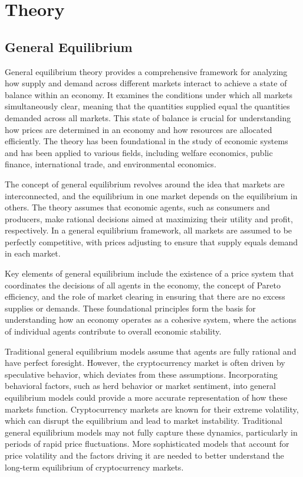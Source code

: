 
\chapter{Theory}
\label{cT} 


\section{General Equilibrium}\label{cTGE}
General equilibrium theory provides a comprehensive framework for analyzing how supply and demand across different markets interact to achieve a state of balance within an economy. It examines the conditions under which all markets simultaneously clear, meaning that the quantities supplied equal the quantities demanded across all markets. This state of balance is crucial for understanding how prices are determined in an economy and how resources are allocated efficiently. The theory has been foundational in the study of economic systems and has been applied to various fields, including welfare economics, public finance, international trade, and environmental economics.

The concept of general equilibrium revolves around the idea that markets are interconnected, and the equilibrium in one market depends on the equilibrium in others. The theory assumes that economic agents, such as consumers and producers, make rational decisions aimed at maximizing their utility and profit, respectively. In a general equilibrium framework, all markets are assumed to be perfectly competitive, with prices adjusting to ensure that supply equals demand in each market.

Key elements of general equilibrium include the existence of a price system that coordinates the decisions of all agents in the economy, the concept of Pareto efficiency, and the role of market clearing in ensuring that there are no excess supplies or demands. These foundational principles form the basis for understanding how an economy operates as a cohesive system, where the actions of individual agents contribute to overall economic stability.

Traditional general equilibrium models assume that agents are fully rational and have perfect foresight. However, the cryptocurrency market is often driven by speculative behavior, which deviates from these assumptions. Incorporating behavioral factors, such as herd behavior or market sentiment, into general equilibrium models could provide a more accurate representation of how these markets function.
Cryptocurrency markets are known for their extreme volatility, which can disrupt the equilibrium and lead to market instability. Traditional general equilibrium models may not fully capture these dynamics, particularly in periods of rapid price fluctuations. More sophisticated models that account for price volatility and the factors driving it are needed to better understand the long-term equilibrium of cryptocurrency markets.

